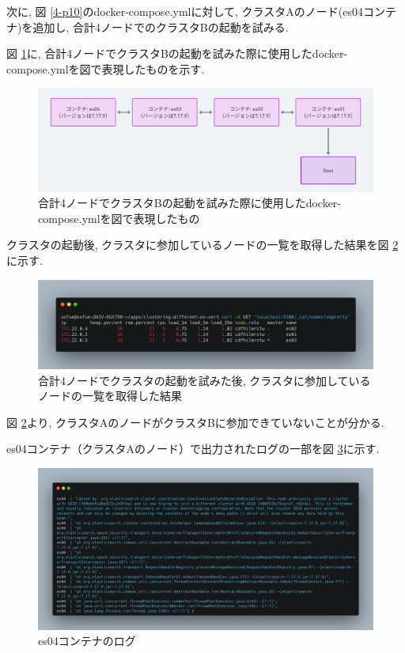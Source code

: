 次に, 図 \ref{4-p10}のdocker-compose.ymlに対して, クラスタAのノード(es04コンテナ)を追加し, 合計4ノードでのクラスタBの起動を試みる.

図 \ref{4-p13}に, 合計4ノードでクラスタBの起動を試みた際に使用したdocker-compose.ymlを図で表現したものを示す.

\begin{figure}
  \begin{center}
    \includegraphics[width=120mm]{sotu/figure/4-7.17.9.png}
    \caption{合計4ノードでクラスタBの起動を試みた際に使用したdocker-compose.ymlを図で表現したもの}
    \label{4-p13}
  \end{center}
\end{figure}

クラスタの起動後, クラスタに参加しているノードの一覧を取得した結果を図 \ref{4-p14}に示す.

\begin{figure}
  \begin{center}
    \includegraphics[width=120mm]{sotu/figure/4nodes-list.png}
    \caption{合計4ノードでクラスタの起動を試みた後, クラスタに参加しているノードの一覧を取得した結果}
    \label{4-p14}
  \end{center}
\end{figure}

図 \ref{4-p14}より, クラスタAのノードがクラスタBに参加できていないことが分かる.

es04コンテナ（クラスタAのノード）で出力されたログの一部を図 \ref{4-p15}に示す.

\begin{figure}
  \begin{center}
    \includegraphics[width=140mm]{sotu/figure/es04-log.png}
    \caption{es04コンテナのログ}
    \label{4-p15}
  \end{center}
\end{figure}

